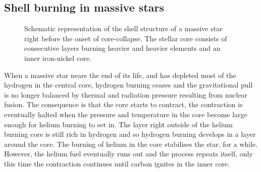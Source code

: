 \subsection{Shell burning in massive stars}
\begin{wrapfigure}{r}{0.5\textwidth}
\caption{Schematic representation of the shell structure of a massive star right before
the onset of core-collapse. The stellar core consists of consecutive layers burning heavier
and heavier elements and an inner iron-nickel core.}
 \label{figSN:onion}
\end{wrapfigure}
When a massive star nears the end of its life, and has depleted most of the hydrogen in the central core,
hydrogen burning ceases and the gravitational pull is no longer balanced by thermal and radiation pressure resulting
from nuclear fusion. The consequence is that the core starts to contract, the contraction is eventually halted when the pressure
and temperature in the core become large enough for helium burning to set in. The layer right outside of the helium burning core is still rich
in hydrogen and so hydrogen burning develops in a layer around the core. The burning of helium in the core stabilises the star, for a while.
However, the helium fuel eventually runs out and the process repeats itself, only this time the contraction continues until carbon ignites in the inner core. 

